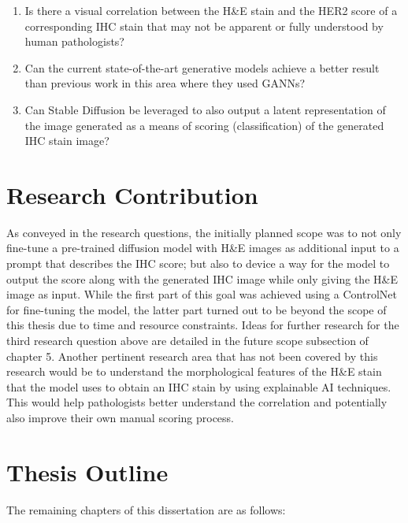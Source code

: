 \begin{enumerate}

\item Is there a visual correlation between the H\&E stain and the HER2 score of a corresponding IHC stain that may not be apparent or fully understood by human pathologists?

\item Can the current state-of-the-art generative models achieve a better result than previous work in this area where they used GANNs?

\item Can Stable Diffusion be leveraged to also output a latent representation of the image generated as a means of scoring (classification) of the generated IHC stain image?
 

\end{enumerate}

\section{Research Contribution}

As conveyed in the research questions, the initially planned scope was to not only fine-tune a pre-trained diffusion model with H\&E images as additional input to a prompt that describes the IHC score; but also to device a way for the model to output the score along with the generated IHC image while only giving the H\&E image as input. While the first part of this goal was achieved using a ControlNet \parencite{Zhang2023AddingModels} for fine-tuning the model, the latter part turned out to be beyond the scope of this thesis due to time and resource constraints. Ideas for further research for the third research question above are detailed in the future scope subsection of chapter 5. Another pertinent research area that has not been covered by this research would be to understand the morphological features of the H\&E stain that the model uses to obtain an IHC stain by using explainable AI techniques. This would help pathologists better understand the correlation and potentially also improve their own manual scoring process.

\pagebreak

\section{Thesis Outline} 

The remaining chapters of this dissertation are as follows:

